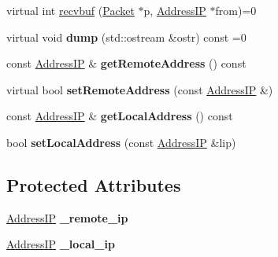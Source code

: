 \begin{DoxyCompactItemize}
\item 
virtual int \hyperlink{classVsnetSocket_a329fcd755206e5bda56c689ee911e35a}{recvbuf} (\hyperlink{classPacket}{Packet} $\ast$p, \hyperlink{structAddressIP}{Address\+IP} $\ast$from)=0
\item 
virtual void {\bfseries dump} (std\+::ostream \&ostr) const =0\hypertarget{classVsnetSocket_a3a486dc410bb623cfaa9c9f47adb4605}{}\label{classVsnetSocket_a3a486dc410bb623cfaa9c9f47adb4605}

\item 
const \hyperlink{structAddressIP}{Address\+IP} \& {\bfseries get\+Remote\+Address} () const \hypertarget{classVsnetSocket_a07eac88d825e21ba83c37e14b0ad1ccb}{}\label{classVsnetSocket_a07eac88d825e21ba83c37e14b0ad1ccb}

\item 
virtual bool {\bfseries set\+Remote\+Address} (const \hyperlink{structAddressIP}{Address\+IP} \&)\hypertarget{classVsnetSocket_a858f57ef5d72c28914b43616d5cf6019}{}\label{classVsnetSocket_a858f57ef5d72c28914b43616d5cf6019}

\item 
const \hyperlink{structAddressIP}{Address\+IP} \& {\bfseries get\+Local\+Address} () const \hypertarget{classVsnetSocket_acdd8bb7c810f780a9510ddc0848e220f}{}\label{classVsnetSocket_acdd8bb7c810f780a9510ddc0848e220f}

\item 
bool {\bfseries set\+Local\+Address} (const \hyperlink{structAddressIP}{Address\+IP} \&lip)\hypertarget{classVsnetSocket_ac2d4085ff5a5845c0807f6130e91a708}{}\label{classVsnetSocket_ac2d4085ff5a5845c0807f6130e91a708}

\end{DoxyCompactItemize}
\subsection*{Protected Attributes}
\begin{DoxyCompactItemize}
\item 
\hyperlink{structAddressIP}{Address\+IP} {\bfseries \+\_\+remote\+\_\+ip}\hypertarget{classVsnetSocket_a28c394ff547accb4e3f55a541068b864}{}\label{classVsnetSocket_a28c394ff547accb4e3f55a541068b864}

\item 
\hyperlink{structAddressIP}{Address\+IP} {\bfseries \+\_\+local\+\_\+ip}\hypertarget{classVsnetSocket_acf692aada44f62b12fcaaab294cf1f00}{}\label{classVsnetSocket_acf692aada44f62b12fcaaab294cf1f00}

\end{DoxyCompactItemize}
